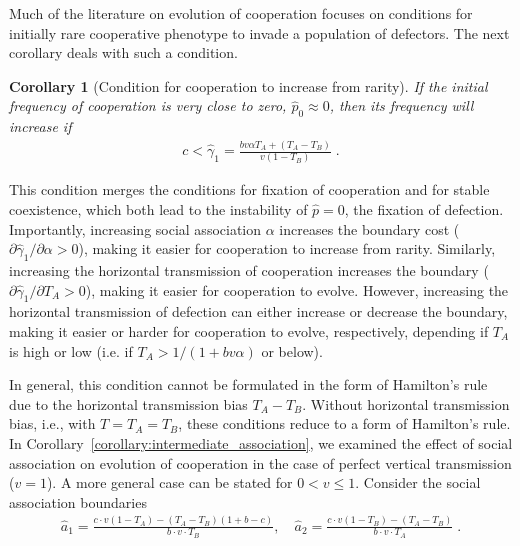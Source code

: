 \documentclass[12pt]{extarticle}
\newtheorem{corollary}{Corollary}
\begin{document}
{Much of the literature on evolution of cooperation focuses on conditions for  initially rare cooperative phenotype to invade a population of defectors.
The next corollary deals with such a condition.
\\

\begin{corollary}[Condition for cooperation to increase from rarity]
\label{corollary:rarity}
  If the initial frequency of cooperation is very close to zero, $\hat{p}_0 \approx 0$, then its frequency will increase if 
  \begin{equation} \label{eq:unequal_transmission_from_rarity_general_case}
  \begin{aligned}
  c < \hat\gamma_1 = \frac{b v \alpha T_A + (T_A - T_B)}{v(1-T_B)} \;.
  \end{aligned}
  \end{equation} 
  \end{corollary}

This condition merges the conditions for fixation of cooperation and for stable coexistence, which both lead to the instability of $\hat{p}=0$, the fixation of defection.
Importantly, increasing social association $\alpha$ increases the boundary cost ($\partial \hat\gamma_1 / \partial \alpha > 0$), making it easier for cooperation to increase from rarity.
Similarly, increasing the horizontal transmission of cooperation increases the boundary ($\partial \hat\gamma_1 / \partial T_A > 0$), making it easier for cooperation to evolve.
However, increasing the horizontal transmission of defection can either increase or decrease the boundary, making it easier or harder for cooperation to evolve, respectively, depending if $T_A$ is high or low (i.e. if $T_A>1/(1+bv\alpha)$ or below).

In general, this condition cannot be formulated in the form of Hamilton's rule due to the horizontal transmission bias $T_A-T_B$.
Without horizontal transmission bias, i.e., with $T=T_A=T_B$, these conditions reduce to a form of Hamilton's rule.
\\

In Corollary~\autoref{corollary:intermediate_association}, we examined the effect of social association on evolution of cooperation in the case of perfect vertical transmission ($v=1$).
A more general case can be stated for $0 < v \leq 1$.
Consider the social association boundaries 
\begin{equation}\begin{aligned}\label{eq:boundries_assortative_meeting_general_case}
  \hat{a}_1 = \frac{c\cdot v(1-T_A) -(T_A-T_B)(1+b-c)}{b\cdot v \cdot T_B}, \quad
  \hat{a}_2 = \frac{c\cdot v(1-T_B)-(T_A-T_B)}{b\cdot v\cdot T_A} \;.
\end{aligned}\end{equation}

}
\end{document}
